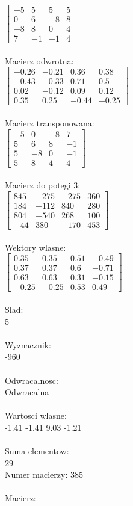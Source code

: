 \documentclass[a4paper,12pt]{article}
\begin{document}
$\begin{bmatrix} -5&5&5&5\\0&6&-8&8\\-8&8&0&4\\7&-1&-1&4 \end{bmatrix}$
\\
\\
Macierz odwrotna:\\

$\begin{bmatrix} -0.26&-0.21&0.36&0.38\\-0.43&-0.33&0.71&0.5\\0.02&-0.12&0.09&0.12\\0.35&0.25&-0.44&-0.25 \end{bmatrix}$
\\
\\
Macierz transponowana:\\

$\begin{bmatrix} -5&0&-8&7\\5&6&8&-1\\5&-8&0&-1\\5&8&4&4 \end{bmatrix}$
\\
\\
Macierz do potegi 3:\\

$\begin{bmatrix} 845&-275&-275&360\\184&-112&840&280\\804&-540&268&100\\-44&380&-170&453 \end{bmatrix}$
\\
\\
Wektory wlasne:\\

$\begin{bmatrix} 0.35&0.35&0.51&-0.49\\0.37&0.37&0.6&-0.71\\0.63&0.63&0.31&-0.15\\-0.25&-0.25&0.53&0.49 \end{bmatrix}$
\\
\\
Slad:\\
5
\\
\\
Wyznacznik:\\
-960
\\
\\
Odwracalnosc:\\
Odwracalna
\\
\\
Wartosci wlasne:\\
-1.41 -1.41 9.03 -1.21
\\
\\
Suma elementow:\\
29
\\
\newpage
Numer macierzy:
385
\\
\\
Macierz:\\
\end{document}

